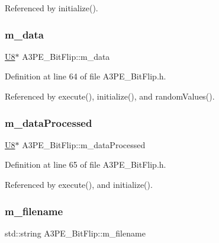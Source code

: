 Referenced by initialize().

\mbox{\label{classA3PE__BitFlip_a06e7c01e11710261168bb0e12e2e4ac5}} 
\subsubsection{\texorpdfstring{m\+\_\+data}{m\_data}}
{\footnotesize\ttfamily \hyperlink{classA3PE__BitFlip_ac561e6bbd8d4101ecc32016314a07581}{U8}$\ast$ A3\+P\+E\+\_\+\+Bit\+Flip\+::m\+\_\+data\hspace{0.3cm}{\ttfamily [private]}}



Definition at line 64 of file A3\+P\+E\+\_\+\+Bit\+Flip.\+h.



Referenced by execute(), initialize(), and random\+Values().

\mbox{\label{classA3PE__BitFlip_a5e64d319904fc8a6fe70b92afcf6ef4f}} 
\subsubsection{\texorpdfstring{m\+\_\+data\+Processed}{m\_dataProcessed}}
{\footnotesize\ttfamily \hyperlink{classA3PE__BitFlip_ac561e6bbd8d4101ecc32016314a07581}{U8}$\ast$ A3\+P\+E\+\_\+\+Bit\+Flip\+::m\+\_\+data\+Processed\hspace{0.3cm}{\ttfamily [private]}}



Definition at line 65 of file A3\+P\+E\+\_\+\+Bit\+Flip.\+h.



Referenced by execute(), and initialize().

\mbox{\label{classA3PE__BitFlip_a72eecaff11d66c7f3eee10a9b2bfa301}} 
\subsubsection{\texorpdfstring{m\+\_\+filename}{m\_filename}}
{\footnotesize\ttfamily std\+::string A3\+P\+E\+\_\+\+Bit\+Flip\+::m\+\_\+filename\hspace{0.3cm}{\ttfamily [private]}}



